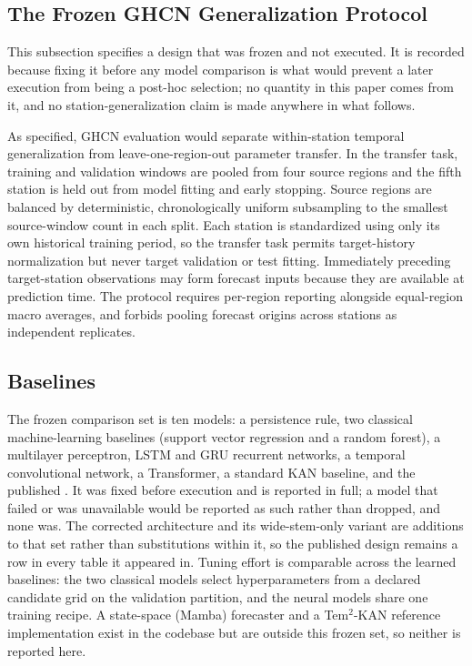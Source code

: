 \subsection{The Frozen GHCN Generalization Protocol}
\label{sec:ghcn_protocol}
This subsection specifies a design that was frozen and not executed. It is recorded because fixing it before any model comparison is what would prevent a later execution from being a post-hoc selection; no quantity in this paper comes from it, and no station-generalization claim is made anywhere in what follows.

As specified, GHCN evaluation would separate within-station temporal generalization from leave-one-region-out parameter transfer. In the transfer task, training and validation windows are pooled from four source regions and the fifth station is held out from model fitting and early stopping. Source regions are balanced by deterministic, chronologically uniform subsampling to the smallest source-window count in each split. Each station is standardized using only its own historical training period, so the transfer task permits target-history normalization but never target validation or test fitting. Immediately preceding target-station observations may form forecast inputs because they are available at prediction time. The protocol requires per-region reporting alongside equal-region macro averages, and forbids pooling forecast origins across stations as independent replicates.

\subsection{Baselines}
The frozen comparison set is ten models: a persistence rule, two classical machine-learning baselines (support vector regression and a random forest), a multilayer perceptron, LSTM and GRU recurrent networks, a temporal convolutional network, a Transformer, a standard KAN baseline, and the published \method. It was fixed before execution and is reported in full; a model that failed or was unavailable would be reported as such rather than dropped, and none was. The corrected architecture and its wide-stem-only variant are additions to that set rather than substitutions within it, so the published design remains a row in every table it appeared in. Tuning effort is comparable across the learned baselines: the two classical models select hyperparameters from a declared candidate grid on the validation partition, and the neural models share one training recipe. A state-space (Mamba) forecaster and a Tem$^2$-KAN reference implementation exist in the codebase but are outside this frozen set, so neither is reported here.

